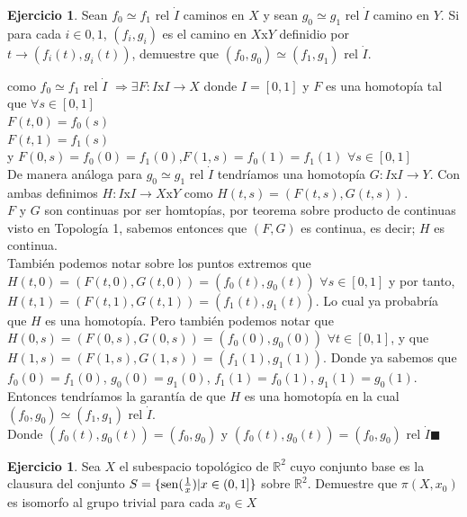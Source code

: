 \documentclass[11pt,a4paper,oneside]{report}
\theoremstyle{definition}
\newtheorem{ejercicio}[definicion]{Ejercicio}
\theoremstyle{plain}
\theoremstyle{remark}
\newcommand{\R}{\mathbb{R}}
\DeclarePairedDelimiter{\conj}{\{}{\}}
\DeclareMathOperator{\sen}{sen}
\begin{document}
\begin{ejercicio}
Sean $f_0\simeq f_1$ rel $\dot{I}$ caminos en $X$ y sean $g_0\simeq g_1$
rel $\dot{I}$ camino en $Y$. Si para cada $i \in {0,1}$, $(f_i,g_i)$ es el camino en $X$x$Y$ 
definidio por $t\rightarrow (f_i(t),g_i(t))$, demuestre que $(f_0,g_0) \simeq (f_1,g_1)$ rel $\dot{I}$.
\end{ejercicio}
como $f_0\simeq f_1$ rel $\dot{I}$ $\Rightarrow \exists F:I$x$I \rightarrow X$ donde $I=[0,1]$ y $F$ es 
una homotopía tal que $\forall s \in [0,1]$\\
$F(t,0)=f_0(s)$\\
$F(t,1)=f_1(s)$\\
y $F(0,s)=f_0(0)=f_1(0)$,$F(1,s)=f_0(1)=f_1(1)$ $\forall s \in [0,1]$\\
De manera análoga para $g_0 \simeq g_1$ rel $\dot{I}$ tendríamos una homotopía $G:I$x$I\rightarrow Y$. 
Con ambas definimos $H:I$x$I\rightarrow X$x$Y$ como $H(t,s)=(F(t,s),G(t,s))$.\\
$F$ y $G$ son continuas por ser homtopías, por teorema sobre producto de continuas visto en Topología 1, sabemos
entonces que $(F,G)$ es continua, es decir; $H$ es continua.\\
También podemos notar sobre los puntos extremos que\\
$H(t,0)=(F(t,0),G(t,0))=(f_0(t),g_0(t))$ $\forall s \in [0,1]$ y por tanto, 
$H(t,1)=(F(t,1),G(t,1))=(f_1(t),g_1(t))$. Lo cual ya probabría que $H$ es una homotopía. 
Pero también podemos notar que\\
$H(0,s)=(F(0,s),G(0,s))=(f_0(0),g_0(0))$ $\forall t \in [0,1]$, y que 
$H(1,s)=(F(1,s),G(1,s))=(f_1(1),g_1(1))$. Donde ya sabemos que $f_0(0)=f_1(0)$, $g_0(0)=g_1(0)$,
$f_1(1)=f_0(1)$, $g_1(1)=g_0(1)$. Entonces tendríamos la garantía de que $H$ es una homotopía en la cual\\
$(f_0,g_0) \simeq (f_1,g_1)$ rel $\dot{I}$.\\
Donde $(f_0(t),g_0(t))=(f_0,g_0)$ y $(f_0(t),g_0(t))=(f_0,g_0)$ rel $\dot{I} \blacksquare$

\begin{ejercicio}
  Sea $X$ el subespacio topológico de $\R^2$ cuyo conjunto base es la clausura del conjunto $S=\conj{\sen(\frac{1}{x})|x\in (0,1]}$
  sobre $\R^2$. Demuestre que $\pi (X,x_0)$ es isomorfo al grupo trivial para cada $x_0 \in X$
\end{ejercicio}
\end{document}
